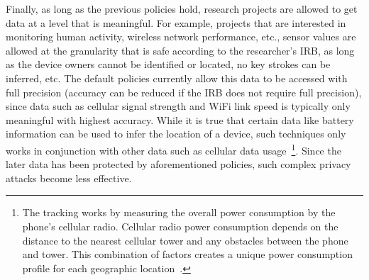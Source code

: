 Finally, as long as the previous policies hold, research 
projects are allowed to get data at a level that is meaningful. For example, 
projects that are interested in monitoring human activity, wireless network 
performance, etc., sensor values are allowed at the granularity that is safe 
according to the researcher's IRB, 
as long as the device owners cannot be identified or located, no key strokes 
can be inferred, etc. The default policies currently allow this data to be 
accessed with full precision (accuracy can be reduced if the IRB
does not require full precision), since data such as cellular signal strength and WiFi 
link speed is typically only meaningful with highest accuracy. While it is true that
certain data like battery information can be used to infer the location of 
a device, such techniques only works in conjunction with other data 
such as cellular data usage~\cite{michalevsky2015powerspy}\footnote{\scriptsize 
The tracking works by measuring the overall power consumption 
by the phone's cellular radio. Cellular radio power consumption depends 
on the distance to the nearest cellular tower and any obstacles between 
the phone and tower. This combination of factors creates a unique power 
consumption profile for each geographic location~\cite{battery-use}.}. 
Since the later data has been protected by aforementioned policies, such 
complex privacy attacks become less effective. 

